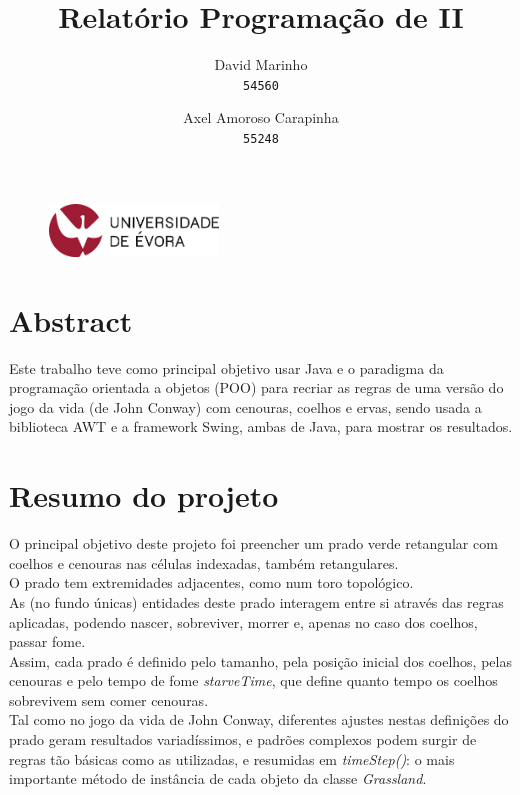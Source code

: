 \documentclass {report}
\title {Relatório Programação de II}
\author{
  David Marinho\\
  \texttt{54560}
  \and
  Axel Amoroso Carapinha\\
  \texttt{55248}
}
\begin{document}
\date{}
\begin{figure}[t]
	\vspace {-2cm}
	\centering
	\includegraphics[width=0.4\textwidth]{uni_logo.png}
\end{figure}
\maketitle

\renewcommand{\thesection}{\arabic{section}}
\makeatother

\tableofcontents 
\newpage

\section{Abstract}
	Este trabalho teve como principal objetivo usar Java e o paradigma da 
	programação orientada a objetos (POO) 
	para recriar as regras de uma versão do jogo da vida (de John Conway) 
	com cenouras, coelhos e ervas,
	sendo usada a biblioteca AWT e a framework Swing, ambas de Java, 
	para mostrar os resultados.

\section{Resumo do projeto}
	O principal objetivo deste projeto foi preencher um prado verde retangular 
	com coelhos e cenouras nas células indexadas, também retangulares.\\
	O prado tem extremidades adjacentes, como num toro topológico.\\
	As (no fundo únicas) entidades deste prado interagem entre si através das 
	regras aplicadas, podendo nascer, sobreviver, morrer e, apenas no caso 
	dos coelhos, passar fome.\\
	Assim, cada prado é definido pelo tamanho, pela posição inicial dos coelhos,
	pelas cenouras e pelo tempo de fome \textit{starveTime}, que define quanto 
	tempo os coelhos sobrevivem sem comer cenouras.\\
	Tal como no jogo da vida de John Conway, diferentes ajustes nestas definições 
	do prado geram resultados variadíssimos, e padrões complexos podem surgir 
	de regras tão básicas como as utilizadas, e resumidas em \textit{timeStep()}: 
	o mais importante método de instância de cada objeto da classe \textit{Grassland}.
\end{document}

